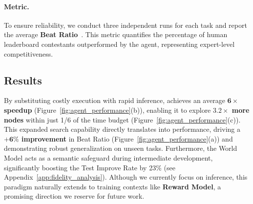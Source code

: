 \paragraph{Metric.} To ensure reliability, we conduct three independent runs for each task and report the average \textbf{Beat Ratio}~\cite{ou2025automindadaptiveknowledgeableagent}. This metric quantifies the percentage of human leaderboard contestants outperformed by the agent, representing expert-level competitiveness.

\subsection{Results}
\label{subsec:agent_result}
By substituting costly execution with rapid inference, \ours achieves an average \textbf{$\bm{6\times}$ speedup} (Figure~\ref{fig:agent_performance}(b)), enabling it to explore \textbf{$\bm{3.2\times}$ more nodes} within just 1/6 of the time budget (Figure~\ref{fig:agent_performance}(c)).
This expanded search capability directly translates into performance, driving a \textbf{$\bm{+6\%}$ improvement} in Beat Ratio (Figure~\ref{fig:agent_performance}(a)) and demonstrating robust generalization on unseen tasks.
Furthermore, the World Model acts as a semantic safeguard during intermediate development, significantly boosting the Test Improve Rate by 23\% (see Appendix~\ref{app:fidelity_analysis}).
Although we currently focus on inference, this paradigm naturally extends to training contexts like \textbf{Reward Model}, a promising direction we reserve for future work.
